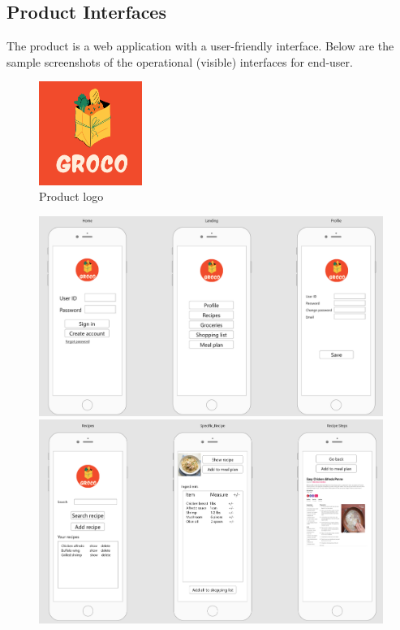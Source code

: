 \subsection{Product Interfaces}
The product is a web application with a user-friendly interface. Below are the sample screenshots of the operational (visible) interfaces for end-user. 
\begin{figure}[H]
	\centering
   	\includegraphics[width=0.3\textwidth]{images/productLogo.png}
    \caption{Product logo}
\end{figure}
\begin{figure}[H]
	\centering
   	\includegraphics[width=1\textwidth]{images/I1.PNG}
   	\includegraphics[width=1\textwidth]{images/I2.PNG}
\end{figure}  
